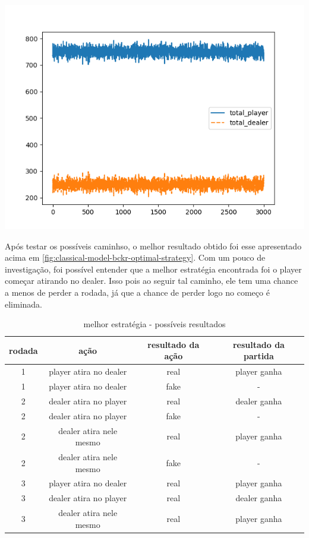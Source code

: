 \documentclass{article}
\begin{document}
\begin{center}
	\includegraphics[scale=0.6]{optimal_player_strategy.png}
	\label{fig:classical-model-bckr-optimal-strategy}
\end{center}

Após testar os possíveis caminhso, o melhor resultado obtido foi esse apresentado acima em \ref{fig:classical-model-bckr-optimal-strategy}. Com um pouco de investigação, foi possível entender que a melhor estratégia encontrada foi o player começar atirando no dealer. Isso pois ao seguir tal caminho, ele tem uma chance a menos de perder a rodada, já que a chance de perder logo no começo é eliminada.

\begin{table}[!h]
	\begin{center}
		\begin{tabular}{ |c|c|c|c| } 
			\hline
			rodada & ação & resultado da ação & resultado da partida \\
			\hline
			1 & player atira no dealer  & real & player ganha\\
			\hline
			1 & player atira no dealer  & fake & -\\
			\hline
			2 & dealer atira no player  & real & dealer ganha\\
			\hline
			2 & dealer atira no player  & fake & -\\
			\hline
			2 & dealer atira nele mesmo  & real & player ganha\\
			\hline
			2 & dealer atira nele mesmo  & fake & -\\
			\hline
			3 & player atira no dealer  & real & player ganha\\
			\hline
			3 & dealer atira no player & real & dealer ganha\\
			\hline
			3 & dealer atira nele mesmo  & real & player ganha\\
			\hline
		\end{tabular}
		\caption{melhor estratégia - possíveis resultados}
	\end{center}
\end{table}
\end{document}
